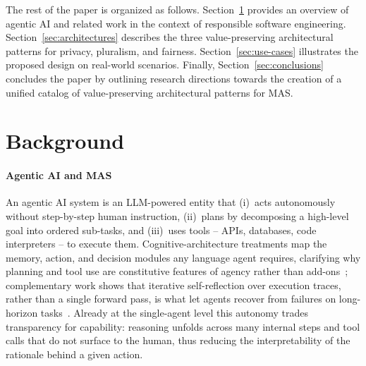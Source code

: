 \documentclass[sigconf,nonacm]{acmart}
\begin{document}
\noindent The rest of the paper is organized as follows.
Section~\ref{sec:background} provides an overview of agentic AI and related work in the context of responsible software engineering.
Section~\ref{sec:architectures} describes the three value-preserving architectural patterns for privacy, pluralism, and fairness. 
Section~\ref{sec:use-cases} illustrates the proposed design on real-world scenarios.
Finally, Section~\ref{sec:conclusions} concludes the paper by outlining research directions towards the creation of a unified catalog of value-preserving architectural patterns for MAS.

\section{Background} %
\label{sec:background}
%
\paragraph{Agentic AI and MAS}
An agentic AI system is an LLM-powered entity that (i)~acts autonomously without step-by-step human instruction, (ii)~plans by decomposing a high-level goal into ordered sub-tasks, and (iii)~uses tools -- APIs, databases, code interpreters -- to execute them.
Cognitive-architecture treatments map the memory, action, and decision modules any language agent requires, clarifying why planning and tool use are constitutive features of agency rather than add-ons~\cite{sumers2024cognitive}; complementary work shows that iterative self-reflection over execution traces, rather than a single forward pass, is what let agents recover from failures on long-horizon tasks~\cite{shinn2023reflexion}.
Already at the single-agent level this autonomy trades transparency for capability: reasoning unfolds across many internal steps and tool calls that do not surface to the human, thus reducing the interpretability of the rationale behind a given action.
 
\end{document}
